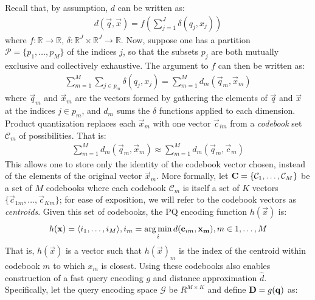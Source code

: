Recall that, by assumption, $d$ can be written as:
\begin{align*}
        d(\vec{q}, \vec{x}) = f(\sum_{j=1}^J \delta(q_j, x_j))
\end{align*}
where $f: \mathbb{R} \rightarrow \mathbb{R}$, $\delta: \mathbb{R}^J \times \mathbb{R}^J \rightarrow \mathbb{R}$. Now, suppose one has a partition $\mathcal{P} = \{p_1,\ldots,p_M \}$ of the indices $j$, so that the subsets $p_j$ are both mutually exclusive and collectively exhaustive.%
The argument to $f$ can then be written as:
\begin{align}
        \sum_{m=1}^M \sum_{j \in p_m} \delta(q_j, x_j)
            = \sum_{m=1}^M d_m(\vec{q}_m, \vec{x}_m)
\end{align}
where $\vec{q}_m$ and $\vec{x}_m$ are the vectors formed by gathering the elements of $\vec{q}$ and $\vec{x}$ at the indices $j \in p_m$, and $d_m$ sums the $\delta$ functions applied to each dimension. Product quantization replaces each $\vec{x}_m$ with one vector $\vec{c}_{im}$ from a \textit{codebook} set $\mathcal{C}_m$ of possibilities. That is: %
\begin{align} \label{eq:pqDistNoLut}
        \sum_{m=1}^M d_m(\vec{q}_m, \vec{x}_m) \approx \sum_{m=1}^M d_m(\vec{q}_m, \vec{c}_{m})
\end{align}
This allows one to store only the identity of the codebook vector chosen, instead of the elements of the original vector $\vec{x}_m$. More formally, let $\mathcal{\mathbf{C}} = \{\mathcal{C}_1,\ldots,\mathcal{C}_M\}$ be a set of $M$ codebooks where each codebook $\mathcal{C}_m $ is itself a set of $K$ vectors $\{\vec{c}_{1m},\ldots,\vec{c}_{Km}\}$; for ease of exposition, we will refer to the codebook vectors as \textit{centroids}. Given this set of codebooks, the PQ encoding function $h(\vec{x})$ is:
\begin{align}
    h(\mathbf{x}) = \langle i_1,\ldots,i_M \rangle,  i_m = \operatorname*{arg\,min}_i d(\mathbf{c}_{im}, \mathbf{x_m}), m \in {1,\ldots,M}
\end{align}
That is, $h(\vec{x})$ is a vector such that $h(\vec{x})_m$ is the index of the centroid within codebook $m$ to which $x_m$ is closest. Using these codebooks also enables construction of a fast query encoding $g$ and distance approximation $\hat{d}$. Specifically, let the query encoding space $\mathcal{G}$ be $R^{M \times K}$ and define $\mathbf{D} = g(\mathbf{q})$ as: %
